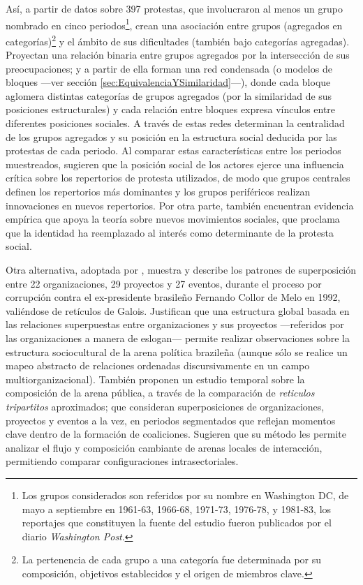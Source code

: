 \documentclass[letterpaper, 11pt]{book}
\theoremstyle{definition}
\theoremstyle{remark}
\begin{document}
Así, a partir de datos sobre 397 protestas, que involucraron al menos un grupo nombrado en cinco periodos\footnote{
    Los grupos considerados son referidos por su nombre en Washington DC, de mayo a septiembre en 1961-63, 1966-68, 1971-73, 1976-78, y 1981-83, los reportajes que constituyen la fuente del estudio fueron publicados por el diario \emph{Washington Post}. 
}, 
\citet{1993_BrmanEvtt_StructureSocialProtest} crean una asociación entre grupos (agregados en categorías)\footnote{
    La pertenencia de cada grupo a una categoría fue determinada por su composición, objetivos establecidos y el origen de miembros clave. 
} 
y el ámbito de sus dificultades (también bajo categorías agregadas). 
Proyectan una relación binaria entre grupos agregados por la intersección de sus preocupaciones; y a partir de ella forman una red condensada (o modelos de bloques 
---ver sección \ref{sec:EquivalenciaYSimilaridad}---), donde cada bloque aglomera distintas categorías de grupos agregados (por la similaridad de sus posiciones estructurales) y cada relación entre bloques expresa vínculos entre diferentes posiciones sociales. 
A través de estas redes determinan la centralidad de los grupos agregados  y su posición en la estructura social deducida por las protestas de cada periodo. 
Al comparar estas características entre los periodos muestreados, sugieren que la posición social de los actores ejerce una influencia crítica sobre los repertorios de protesta utilizados, de modo que grupos centrales definen los repertorios más dominantes y los grupos periféricos realizan innovaciones en nuevos repertorios. 
Por otra parte, también encuentran evidencia empírica que apoya la teoría sobre nuevos movimientos sociales, que proclama que la identidad ha reemplazado al interés como determinante de la protesta social. 


Otra alternativa, adoptada por \citet{2000_MischePattison_civicArena}, muestra y describe los patrones de superposición entre 22 organizaciones, 29 proyectos y 27 eventos, durante el proceso por corrupción contra el ex-presidente brasileño Fernando Collor de Melo en 1992, valiéndose de retículos de Galois. 
Justifican que una estructura global basada en las relaciones superpuestas entre organizaciones y sus proyectos ---referidos por las organizaciones a manera de eslogan--- permite realizar observaciones sobre la estructura sociocultural de la arena política brazileña (aunque sólo se realice un mapeo abstracto de relaciones ordenadas discursivamente en un campo multiorganizacional). 
También proponen un estudio temporal sobre la composición de la arena pública, a través de la comparación de \emph{reticulos tripartitos} aproximados; que consideran superposiciones de organizaciones, proyectos y eventos a la vez, en periodos segmentados que reflejan momentos clave dentro de la formación de coaliciones. 
Sugieren que su método les permite analizar el flujo y composición cambiante de arenas locales de interacción, permitiendo comparar configuraciones intrasectoriales. 
\end{document}
